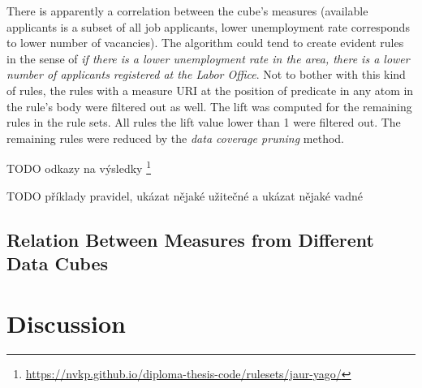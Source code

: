 There is apparently a correlation between the cube's measures (available applicants is a subset of all job applicants, lower unemployment rate corresponds to lower number of vacancies). The algorithm could tend to create evident rules in the sense of \textit{if there is a lower unemployment rate in the area, there is a lower number of applicants registered at the Labor Office}. Not to bother with this kind of rules, the rules with a measure URI at the position of predicate in any atom in the rule's body were filtered out as well. The lift was computed for the remaining rules in the rule sets. All rules the lift value lower than 1 were filtered out. The remaining rules were reduced by the \textit{data coverage pruning} method.

TODO odkazy na výsledky \footnote{\href{https://nvkp.github.io/diploma-thesis-code/rulesets/jaur-yago/}{https://nvkp.github.io/diploma-thesis-code/rulesets/jaur-yago/}}



TODO příklady pravidel, ukázat nějaké užitečné a ukázat nějaké vadné

\subsection{Relation Between Measures from Different Data Cubes}





\section{Discussion}